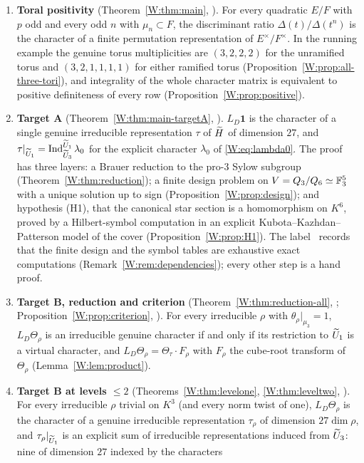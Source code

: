 \begin{enumerate}[leftmargin=*]
\item \textbf{Toral positivity} (Theorem~\ref{W:thm:main}, \Ptag).  For
every quadratic $E/F$ with $p$ odd and every odd $n$ with $\mu_n\subset F$,
the discriminant ratio $\Delta(t)/\Delta(t^n)$ is the character of a
finite permutation representation of $E^\times/F^\times$.  In the running
example the genuine torus multiplicities are $(3,2,2,2)$ for the
unramified torus and $(3,2,1,1,1,1)$ for either ramified torus
(Proposition~\ref{W:prop:all-three-tori}), and integrality of the whole
character matrix is equivalent to positive definiteness of every row
(Proposition~\ref{W:prop:positive}).
\item \textbf{Target A} (Theorem~\ref{W:thm:main-targetA}, \Pctag).
$L_D\mathbf1$ is the character of a single genuine irreducible
representation $\tau$ of $\widetilde H$ of dimension $27$, and
$\tau|_{\widetilde U_1}=\operatorname{Ind}_{\widetilde U_3}^{\widetilde U_1}\lambda_0$ for the explicit character
$\lambda_0$ of \eqref{W:eq:lambda0}.  The proof has three layers: a
Brauer reduction to the pro-$3$ Sylow subgroup
(Theorem~\ref{W:thm:reduction}); a finite design problem on
$V=Q_3/Q_6\simeq\mathbb F_3^5$ with a unique solution up to sign
(Proposition~\ref{W:prop:design}); and hypothesis (H1), that the
canonical star section is a homomorphism on $K^6$, proved by a
Hilbert-symbol computation in an explicit Kubota--Kazhdan--Patterson
model of the cover (Proposition~\ref{W:prop:H1}).  The label \Pctag\
records that the finite design and the symbol tables are exhaustive
exact computations (Remark~\ref{W:rem:dependencies}); every other step is
a hand proof.
\item \textbf{Target B, reduction and criterion}
(Theorem~\ref{W:thm:reduction-all}, \Ptag; Proposition~\ref{W:prop:criterion}, \Pctag).
For every irreducible $\rho$ with $\theta_\rho|_{\mu_3}=1$,
$L_D\Theta_\rho$ is an irreducible genuine character if and only if its
restriction to $\widetilde U_1$ is a virtual character, and
$L_D\Theta_\rho=\Theta_\tau\cdot F_\rho$ with $F_\rho$ the cube-root
transform of $\Theta_\rho$ (Lemma~\ref{W:lem:product}).
\item \textbf{Target B at levels $\le2$}
(Theorems~\ref{W:thm:levelone}, \ref{W:thm:leveltwo}, \Pctag).  For every
irreducible $\rho$ trivial on $K^3$ (and every norm twist of one),
$L_D\Theta_\rho$ is the character of a genuine irreducible
representation $\tau_\rho$ of dimension $27\dim\rho$, and
$\tau_\rho|_{\widetilde U_1}$ is an explicit sum of irreducible representations
induced from $\widetilde U_3$: nine of dimension $27$ indexed by the characters

\end{enumerate}
